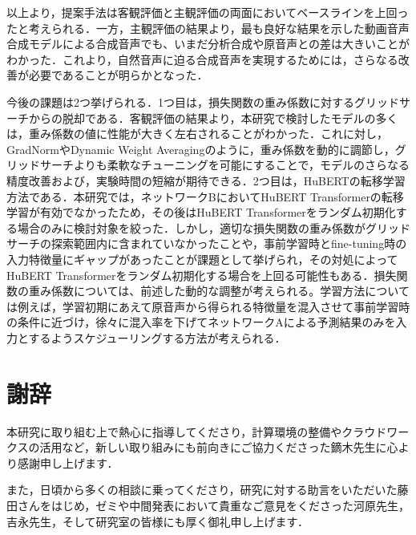 \documentclass[12pt]{jarticle}
\numberwithin{equation}{section}    %
\numberwithin{figure}{section}      %
\numberwithin{table}{section}      %
\begin{document}
以上より，提案手法は客観評価と主観評価の両面においてベースラインを上回ったと考えられる．一方，主観評価の結果より，最も良好な結果を示した動画音声合成モデルによる合成音声でも、いまだ分析合成や原音声との差は大きいことがわかった．これより，自然音声に迫る合成音声を実現するためには，さらなる改善が必要であることが明らかとなった．

今後の課題は2つ挙げられる．1つ目は，損失関数の重み係数に対するグリッドサーチからの脱却である．客観評価の結果より，本研究で検討したモデルの多くは，重み係数の値に性能が大きく左右されることがわかった．これに対し，GradNormやDynamic Weight Averagingのように，重み係数を動的に調節し，グリッドサーチよりも柔軟なチューニングを可能にすることで，モデルのさらなる精度改善および，実験時間の短縮が期待できる．2つ目は，HuBERTの転移学習方法である．本研究では，ネットワークBにおいてHuBERT Transformerの転移学習が有効でなかったため，その後はHuBERT Transformerをランダム初期化する場合のみに検討対象を絞った．しかし，適切な損失関数の重み係数がグリッドサーチの探索範囲内に含まれていなかったことや，事前学習時とfine-tuning時の入力特徴量にギャップがあったことが課題として挙げられ，その対処によってHuBERT Transformerをランダム初期化する場合を上回る可能性もある．損失関数の重み係数については、前述した動的な調整が考えられる。学習方法については例えば，学習初期にあえて原音声から得られる特徴量を混入させて事前学習時の条件に近づけ，徐々に混入率を下げてネットワークAによる予測結果のみを入力とするようスケジューリングする方法が考えられる．

\clearpage

\section*{謝辞}
本研究に取り組む上で熱心に指導してくださり，計算環境の整備やクラウドワークスの活用など，新しい取り組みにも前向きにご協力くださった鏑木先生に心より感謝申し上げます．

また，日頃から多くの相談に乗ってくださり，研究に対する助言をいただいた藤田さんをはじめ，ゼミや中間発表において貴重なご意見をくださった河原先生，吉永先生，そして研究室の皆様にも厚く御礼申し上げます．

\clearpage


% 

\end{document}
